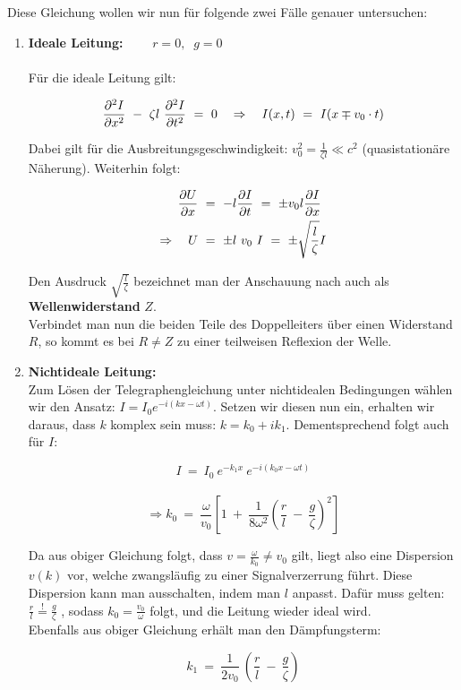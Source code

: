 Diese Gleichung wollen wir nun für folgende zwei Fälle genauer untersuchen:

\begin{enumerate}
\item \textbf{ Ideale Leitung:} $\qquad r=0, \; \; g=0$
\ \\
\ \\
Für die ideale Leitung gilt:

\begin{equation*}
\pddiff{I}{x} \ - \ \zeta l \ \pddiff{I}{t} \ = \  	0 \quad \Rightarrow\quad I(x,t)  \ = \ I(x \mp v_0\cdot t)
\end{equation*}

Dabei gilt für die Ausbreitungsgeschwindigkeit: $v_0^2 = \frac{1}{\zeta l} \ll c^2$ (quasistationäre Näherung).
\newpage
Weiterhin folgt:

\begin{align*}
\frac{\partial{U}}{\partial{x}} \ &= \ - l\frac{\partial{I}}{\partial{t}} \ = \ \pm v_0 l \frac{\partial{I}}{\partial{x}}\\
\Rightarrow \quad U \ &= \ \pm l \ v_0 \ I  \ = \ \pm \sqrt{\frac{l}{\zeta}}I 
\end{align*}

Den Ausdruck $\sqrt{\frac{l}{\zeta}}$ bezeichnet man der Anschauung nach auch als \textbf{Wellenwiderstand} $Z$.\\
Verbindet man nun die beiden Teile des Doppelleiters über einen Widerstand $R$, so kommt es bei $R\neq Z$ zu einer teilweisen Reflexion der Welle.\\

\item \textbf{ Nichtideale Leitung:}
\ \\

Zum Lösen der Telegraphengleichung unter nichtidealen Bedingungen wählen wir den Ansatz: $I=I_0 e^{-i(kx-\omega t)}$. Setzen wir diesen nun ein, erhalten wir daraus, dass $k$ komplex sein muss: $k=k_0 + ik_1$. Dementsprechend folgt auch für $I$:

\begin{equation*}
I  \ = \ I_0 \ e^{-k_1 x} \ e^{-i(k_0 x -\omega t)}
\end{equation*}
\ \\
\begin{equation*}
\Rightarrow k_0  \ = \ \frac{\omega}{v_0}\left[1 \ + \ \frac{1}{8\omega^2}\left(\frac{r}{l} \ - \ \frac{g}{\zeta}\right)^2\right]
\end{equation*}

Da aus obiger Gleichung folgt, dass $v= \frac{\omega}{k_0}\neq v_0$ gilt, liegt also eine Dispersion $v(k)$ vor, welche zwangsläufig zu einer Signalverzerrung führt. Diese Dispersion kann man \grqq ausschalten\grqq , indem man  $l$ anpasst. Dafür muss gelten: $\frac{r}{l} \overset{!}{=}   \frac{g}{\zeta}$ , sodass $k_0 =\frac{v_0}{\omega}$ folgt, und die Leitung wieder ideal wird.\\
Ebenfalls aus obiger Gleichung erhält man den Dämpfungsterm:

\begin{equation*}
k_1  \ = \ \frac{1}{2v_0} \ \left(\frac{r}{l} \ - \ \frac{g}{\zeta}\right)
\end{equation*}
\end{enumerate}

